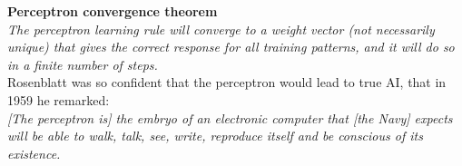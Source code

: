 \documentclass[10pt, compress]{beamer}
\begin{document}
\begin{frame}
  \textbf{Perceptron convergence theorem} \\ \hfill \break
  \textit{The perceptron learning rule will converge to a weight vector (not necessarily unique) that  gives  the  correct  response  for  all  training  patterns,  and it will do so in a finite number of steps.} \\ \hfill \break
  Rosenblatt was so confident that the perceptron would lead to true AI, that in 1959 he remarked: \\ \hfill \break
  \textit{[The perceptron is] the embryo of an electronic computer that [the Navy] expects will be able to walk, talk, see, write, reproduce itself and be conscious of its existence.}

\end{frame}
\end{document}
